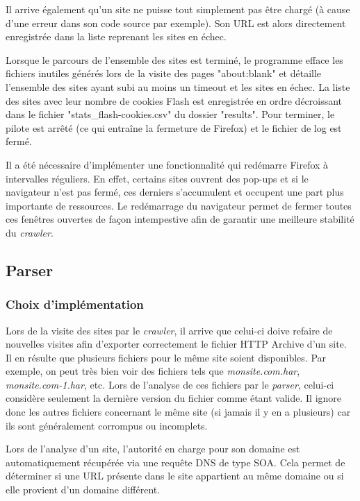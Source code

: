 Il arrive également qu'un site ne puisse tout simplement pas être chargé (à cause d'une erreur dans son code source par exemple). Son URL est alors directement enregistrée dans la liste reprenant les sites en échec.
\newline

Lorsque le parcours de l'ensemble des sites est terminé, le programme efface les fichiers inutiles générés lors de la visite des pages "about:blank" et détaille l'ensemble des sites ayant subi au moins un timeout et les sites en échec. La liste des sites avec leur nombre de cookies Flash est enregistrée en ordre décroissant dans le fichier "stats\_flash-cookies.csv" du dossier "results". Pour terminer, le pilote est arrêté (ce qui entraîne la fermeture de Firefox) et le fichier de log est fermé.
\newline

Il a été nécessaire d'implémenter une fonctionnalité qui redémarre Firefox à intervalles réguliers. En effet, certains sites ouvrent des pop-ups et si le navigateur n'est pas fermé, ces derniers s'accumulent et occupent une part plus importante de ressources. Le redémarrage du navigateur permet de fermer toutes ces fenêtres ouvertes de façon intempestive afin de garantir une meilleure stabilité du \textit{crawler}.

\subsection{Parser}
\label{parser}
\subsubsection{Choix d'implémentation}
Lors de la visite des sites par le \textit{crawler}, il arrive que celui-ci doive refaire de nouvelles visites afin d'exporter correctement le fichier HTTP Archive d'un site. Il en résulte que plusieurs fichiers pour le même site soient disponibles. Par exemple, on peut très bien voir des fichiers tels que \textit{monsite.com.har}, \textit{monsite.com-1.har}, etc. Lors de l'analyse de ces fichiers par le \textit{parser}, celui-ci considère seulement la dernière version du fichier comme étant valide. Il ignore donc les autres fichiers concernant le même site (si jamais il y en a plusieurs) car ils sont généralement corrompus ou incomplets.
\newline

Lors de l'analyse d'un site, l'autorité en charge pour son domaine est automatiquement récupérée via une requête DNS de type SOA. Cela permet de déterminer si une URL présente dans le site appartient au même domaine ou si elle provient d'un domaine différent.

